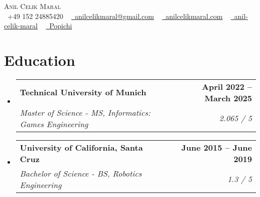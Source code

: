 \documentclass[letterpaper,11pt]{article}
\makeatletter
\newcommand{\resumeSubheading}[4]{
  \vspace{-2pt}\item
    \begin{tabular*}{1.0\textwidth}[t]{l@{\extracolsep{\fill}}r}
      \textbf{#1} & \textbf{\small #2} \\
      \textit{\small#3} & \textit{\small #4} \\
    \end{tabular*}\vspace{-7pt}
}
\newcommand{\resumeSubHeadingListStart}{\begin{itemize}[leftmargin=0.0in, label={}]}
\newcommand{\resumeSubHeadingListEnd}{\end{itemize}}
\makeatother
\begin{document}

\begin{center}
    {\Huge \scshape Anil Celik Maral} \\ \vspace{1pt}
    \vspace{1pt}
    \small \raisebox{-0.1\height}\faPhone\ +49 152 24885420 ~ \href{mailto:anilcelikmaral@gmail.com}{\raisebox{-0.2\height}\faEnvelope\  \underline{anilcelikmaral@gmail.com}} ~ 
    \href{https://anilcelikmaral.com/}{\raisebox{-0.2\height}\faGlobe\ \underline{anilcelikmaral.com}}  ~
    \href{https://www.linkedin.com/in/anil-celik-maral/}{\raisebox{-0.2\height}\faLinkedin\ \underline{anil-celik-maral}}  ~
    \href{https://github.com/Popichi}{\raisebox{-0.2\height}\faGithub\ \underline{Popichi}}
    \vspace{-10pt}  
    
\end{center}


\section{Education}
  \resumeSubHeadingListStart
    \resumeSubheading
      {Technical University of Munich}{April 2022 -- March 2025}
      {Master of Science - MS, Informatics: Games Engineering}{2.065 / 5}
      \resumeSubheading
      {University of California, Santa Cruz}{June 2015 -- June 2019}
      {Bachelor of Science - BS, Robotics Engineering}{1.3 / 5}

  \resumeSubHeadingListEnd

       

\vspace{-10pt}
\end{document}
